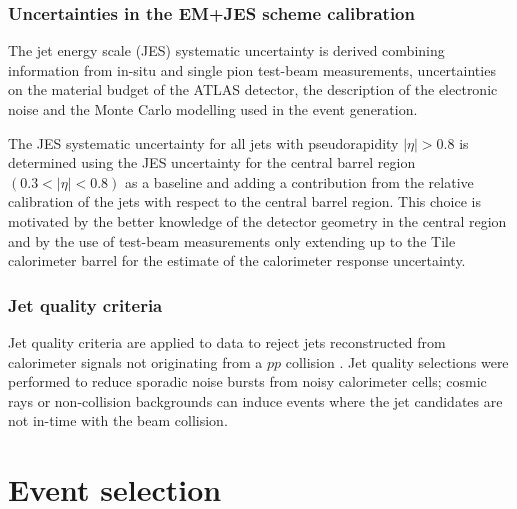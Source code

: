 \documentclass[12pt, twoside]{article}
\numberwithin{equation}{section}
\numberwithin{figure}{section}
\begin{document}
\subsubsection{Uncertainties in the EM+JES scheme calibration}
\label{subsubsec:UncertaintiesInTheEM+JESSchemeCalibration}

The jet energy scale (JES) systematic uncertainty is derived combining information from in-situ and single pion test-beam measurements, uncertainties on the material budget of the ATLAS detector, the description of the electronic noise and the Monte Carlo modelling used in the event generation.

The JES systematic uncertainty for all jets with pseudorapidity $\left| \eta \right| > 0.8$ is determined using the JES uncertainty for the central barrel region $\left( 0.3 < \left| \eta \right| < 0.8 \right)$ as a baseline and adding a contribution from the relative calibration of the jets with respect to the central barrel region. This choice is motivated by the better knowledge of the detector geometry in the central region and by the  use of test-beam measurements only extending up to the Tile calorimeter barrel for the estimate of the calorimeter response uncertainty.

\subsubsection{Jet quality criteria}
\label{subsubsec:JetQualityCriteria}

Jet quality criteria are applied to data to reject jets reconstructed from calorimeter signals not originating from a $pp$ collision \cite{jetQualityCriteria}. Jet quality selections were performed to reduce sporadic noise bursts from noisy calorimeter cells; cosmic rays or non-collision backgrounds can induce events where the jet candidates are not in-time with the beam collision.

%
%
\newpage
\thispagestyle{empty}
\section{Event selection}
\label{sec:EventSelection}
\vspace{1.0cm}
\end{document}
